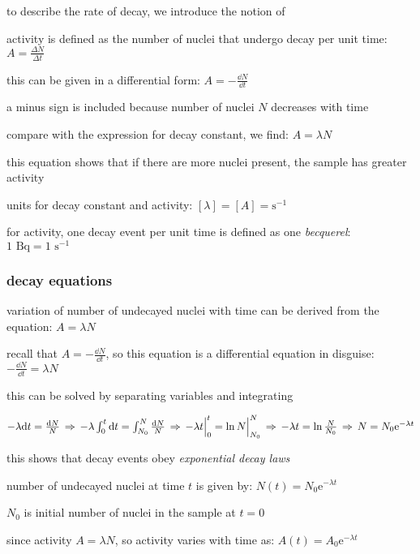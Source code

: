 \cmt to describe the rate of decay, we introduce the notion of 

activity is defined as the number of nuclei that undergo decay per unit time: $\boxed{A=\frac{\Delta N}{\Delta t}}$

this can be given in a differential form: $A = - \frac{\dd N}{\dd t}$

a minus sign is included because number of nuclei $N$ decreases with time

\cmt compare with the expression for decay constant, we find: $\boxed{A=\lambda N}$

this equation shows that if there are more nuclei present, the sample has greater activity

\cmt units for decay constant and activity: $[\lambda] = [A] = \text{s}^{-1}$

for activity, one decay event per unit time is defined as one \emph{becquerel}: $1 \text{ Bq} = 1 \text{ s}^{-1}$



\subsubsection{decay equations}

variation of number of undecayed nuclei with time can be derived from the equation: $A=\lambda N$

recall that $A = - \frac{\dd N}{\dd t}$, so this equation is a differential equation in disguise: $- \frac{\dd N}{\dd t} = \lambda N$

this can be solved by separating variables and integrating

{

\centering

$- \lambda \mathrm{d} t = \frac{\mathrm{d} N}{N} \, \Rightarrow \,
- \lambda \int_0^t \mathrm{d} t = \int_{N_0}^{N} \frac{\mathrm{d} N}{N} \, \Rightarrow \,
- \lambda t \Big|_{0}^{t}= \ln N \Big|_{N_0}^{N} \, \Rightarrow \,
- \lambda t = \ln \frac{N}{N_0} \, \Rightarrow \,
N = N_0 \mathrm{e}^{- \lambda t}$

}

this shows that decay events obey \emph{exponential decay laws}

\cmt number of undecayed nuclei at time $t$ is given by: $\boxed{N(t)=N_0 \mathrm{e}^{- \lambda t}}$

$N_0$ is initial number of nuclei in the sample at $t=0$

\cmt since activity $A=\lambda N$, so activity varies with time as: $\boxed{A(t) = A_0 \mathrm{e}^{- \lambda t}}$

